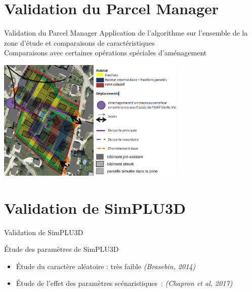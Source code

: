 \documentclass[xcolor=table]{beamer}
\begin{document}
\section{Validation du Parcel Manager}

\begin{frame}{Validation du Parcel Manager}
	Application de l'algorithme sur l'ensemble de la zone d'étude et comparaisons de caractéristiques
	\\
	Comparaisons avec certaines opérations spéciales d'aménagement
	\begin{block}{}
		\includegraphics[width=9cm]{Images/OAPTour-de-Say2.png}
	\end{block}
\end{frame}

\section{Validation de SimPLU3D}

\begin{frame}{Validation de SimPLU3D}
	\begin{block}{Étude des paramètres de SimPLU3D}
		\begin{itemize}
			\item Étude du caractère aléatoire : très faible \textit{(Brasebin, 2014)}
			\item Étude de l'effet des paramètres scénaristiques~: \textit{(Chapron et al, 2017)}
		\end{itemize}
	\end{block}
\end{frame}
\end{document}
